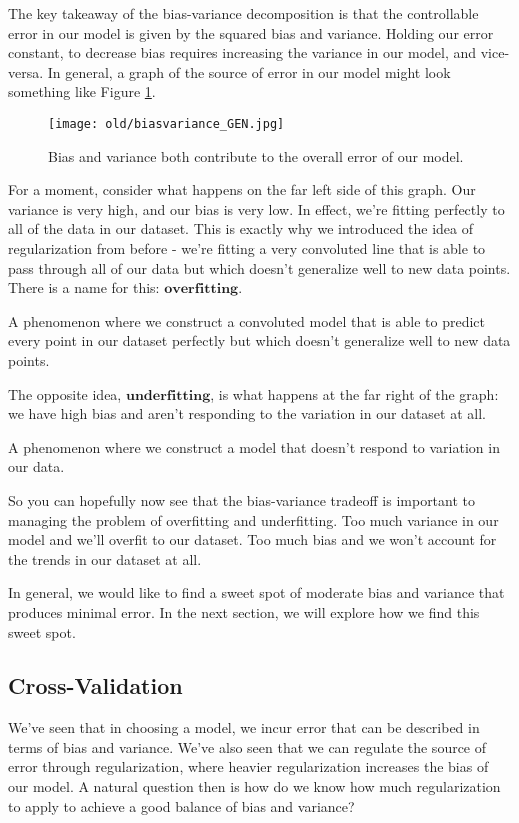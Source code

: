 \newpage
The key takeaway of the bias-variance decomposition is that the controllable error in our model is given by the squared bias and variance. Holding our error constant, to decrease bias requires increasing the variance in our model, and vice-versa. In general, a graph of the source of error in our model might look something like Figure \ref{fig:bias-vs-variance}.

\begin{figure}
    \centering
    \texttt{[image: old/biasvariance\_GEN.jpg]}
    \caption{Bias and variance both contribute to the overall error of our model.}
    \label{fig:bias-vs-variance}
\end{figure}

For a moment, consider what happens on the far left side of this graph. Our variance is very high, and our bias is very low. In effect, we're fitting perfectly to all of the data in our dataset. This is exactly why we introduced the idea of regularization from before - we're fitting a very convoluted line that is able to pass through all of our data but which doesn't generalize well to new data points. There is a name for this: $\mathbf{overfitting}$.

\begin{definition}[overfitting]
    A phenomenon where we construct a convoluted model that is able to predict every point in our dataset perfectly but which doesn't generalize well to new data points.
\end{definition}

The opposite idea, $\mathbf{underfitting}$, is what happens at the far right of the graph: we have high bias and aren't responding to the variation in our dataset at all.

\begin{definition}[underfitting]
    A phenomenon where we construct a model that doesn't respond to variation in our data.
\end{definition}

So you can hopefully now see that the bias-variance tradeoff is important to managing the problem of overfitting and underfitting. Too much variance in our model and we'll overfit to our dataset. Too much bias and we won't account for the trends in our dataset at all.

In general, we would like to find a sweet spot of moderate bias and variance that produces minimal error. In the next section, we will explore how we find this sweet spot.

\subsection{Cross-Validation}
We've seen that in choosing a model, we incur error that can be described in terms of bias and variance. We've also seen that we can regulate the source of error through regularization, where heavier regularization increases the bias of our model. A natural question then is how do we know how much regularization to apply to achieve a good balance of bias and variance?

